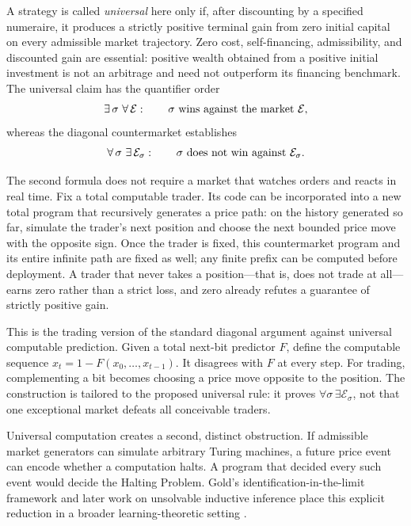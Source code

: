 \documentclass[aps,pra,reprint,superscriptaddress,amsmath,amssymb,floatfix]{revtex4-2}
\theoremstyle{plain}
\theoremstyle{definition}
\theoremstyle{remark}
\begin{document}
A strategy is called \emph{universal} here only if, after discounting by a
specified numeraire, it produces a strictly positive terminal gain from zero
initial capital on every admissible market trajectory. Zero cost,
self-financing, admissibility, and discounted gain are essential: positive
wealth obtained from a positive initial investment is not an arbitrage and
need not outperform its financing benchmark. The universal claim has the
quantifier order
\begin{equation}
  \exists\,\sigma\ \forall\,\mathcal E:
  \qquad \sigma\ \hbox{wins against the market }\mathcal E ,
  \label{eq:universalquantifiers}
\end{equation}
whereas the diagonal countermarket establishes
\begin{equation}
  \forall\,\sigma\ \exists\,\mathcal E_\sigma:
  \qquad \sigma\ \hbox{does not win against }\mathcal E_\sigma .
  \label{eq:counterquantifiers}
\end{equation}

The second formula does not require a market that watches orders and reacts in
real time. Fix a total computable trader. Its code can be incorporated into a
new total program that recursively generates a price path: on the history
generated so far, simulate the trader's next position and choose the next
bounded price move with the opposite sign. Once the trader is fixed, this
countermarket program and its entire infinite path are fixed as well; any
finite prefix can be computed before deployment. A trader that never takes a
position---that is, does not trade at all---earns zero rather than a strict
loss, and zero already refutes a guarantee of strictly positive gain.

This is the trading version of the standard diagonal argument against
universal computable prediction. Given a total next-bit predictor \(F\), define
the computable sequence \(x_t=1-F(x_0,\ldots,x_{t-1})\). It disagrees with
\(F\) at every step. For trading, complementing a bit becomes choosing a price
move opposite to the position. The construction is tailored to the proposed
universal rule: it proves \(\forall\sigma\,\exists\mathcal E_\sigma\), not that
one exceptional market defeats all conceivable traders.

Universal computation creates a second, distinct obstruction. If admissible
market generators can simulate arbitrary Turing machines, a future price event
can encode whether a computation halts. A program that decided every such
event would decide the Halting Problem. Gold's
identification-in-the-limit framework and later work on unsolvable inductive
inference place this explicit reduction in a broader learning-theoretic setting
\cite{go-67,ad-91,angluin:83,2016-AlexanderKarlSvozil-ml,moore}.
\end{document}
